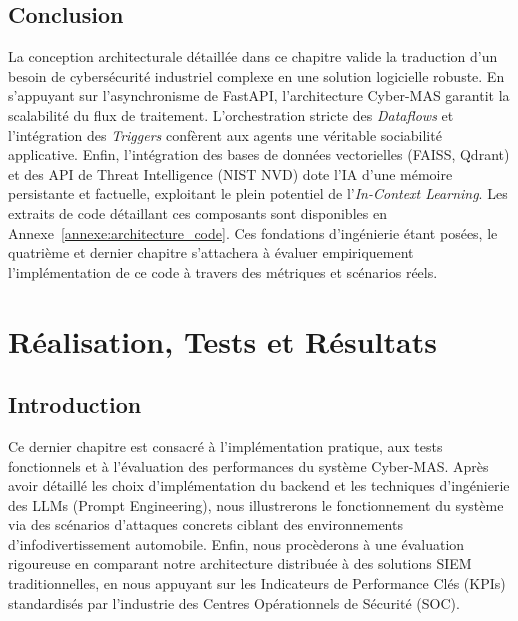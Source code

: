 \documentclass[a4paper, 12pt]{report}
\begin{document}
\section*{Conclusion}
La conception architecturale détaillée dans ce chapitre valide la traduction d'un besoin de cybersécurité industriel complexe en une solution logicielle robuste. En s'appuyant sur l'asynchronisme de FastAPI, l'architecture Cyber-MAS garantit la scalabilité du flux de traitement. L'orchestration stricte des \textit{Dataflows} et l'intégration des \textit{Triggers} confèrent aux agents une véritable sociabilité applicative. Enfin, l'intégration des bases de données vectorielles (FAISS, Qdrant) et des API de Threat Intelligence (NIST NVD) dote l'IA d'une mémoire persistante et factuelle, exploitant le plein potentiel de l'\textit{In-Context Learning}. Les extraits de code détaillant ces composants sont disponibles en Annexe~\ref{annexe:architecture_code}. Ces fondations d'ingénierie étant posées, le quatrième et dernier chapitre s'attachera à évaluer empiriquement l'implémentation de ce code à travers des métriques et scénarios réels.
\chapter{Réalisation, Tests et Résultats}
\label{chap:realisation_tests}

\section*{Introduction}
Ce dernier chapitre est consacré à l'implémentation pratique, aux tests fonctionnels et à l'évaluation des performances du système Cyber-MAS. Après avoir détaillé les choix d'implémentation du backend et les techniques d'ingénierie des LLMs (Prompt Engineering), nous illustrerons le fonctionnement du système via des scénarios d'attaques concrets ciblant des environnements d'infodivertissement automobile. Enfin, nous procèderons à une évaluation rigoureuse en comparant notre architecture distribuée à des solutions SIEM traditionnelles, en nous appuyant sur les Indicateurs de Performance Clés (KPIs) standardisés par l'industrie des Centres Opérationnels de Sécurité (SOC).
\end{document}
